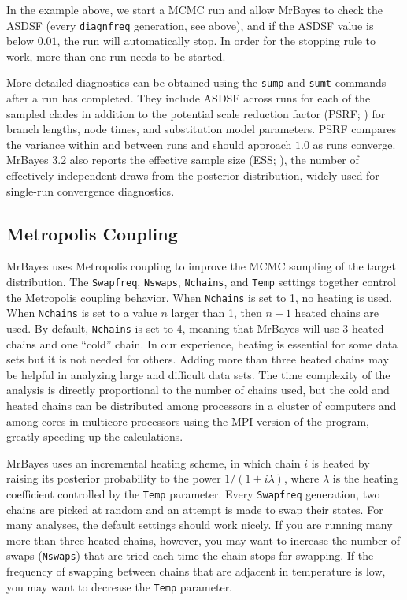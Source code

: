 \documentclass[12pt]{book}
\newcommand{\ttt}[1]{\texttt{#1}}
\begin{document}
In the example above, we start a MCMC run and allow MrBayes to check the ASDSF (every
\ttt{diagnfreq} generation, see above), and if the ASDSF value is below $0.01$, the run will
automatically stop. In order for the stopping rule to work, more than one run needs to be started.

More detailed diagnostics can be obtained using the \ttt{sump} and \ttt{sumt} commands after a run
has completed. They include ASDSF across runs for each of the sampled clades in addition to the
potential scale reduction factor (PSRF; \citep{gelman92}) for branch lengths, node times, and
substitution model parameters. PSRF compares the variance within and between runs and should
approach $1.0$ as runs converge. MrBayes 3.2 also reports the effective sample size (ESS;
\citep{ripley87}), the number of effectively independent draws from the posterior distribution,
widely used for single-run convergence diagnostics.


\subsection{Metropolis Coupling}
\label{metropolisCoupling}

MrBayes uses Metropolis coupling to improve the MCMC sampling of the target distribution. The
\ttt{Swapfreq}, \ttt{Nswaps}, \ttt{Nchains}, and \ttt{Temp} settings together control the
Metropolis coupling behavior. When \ttt{Nchains} is set to 1, no heating is used. When
\ttt{Nchains} is set to a value $n$ larger than 1, then $n - 1$ heated chains are used. By default,
\ttt{Nchains} is set to 4, meaning that MrBayes will use 3 heated chains and one ``cold'' chain. In
our experience, heating is essential for some data sets but it is not needed for others. Adding
more than three heated chains may be helpful in analyzing large and difficult data sets. The time
complexity of the analysis is directly proportional to the number of chains used, but the cold and
heated chains can be distributed among processors in a cluster of computers and among cores in
multicore processors using the MPI version of the program, greatly speeding up the calculations.

MrBayes uses an incremental heating scheme, in which chain $i$ is heated by raising its posterior
probability to the power $1/ (1 + i\lambda)$, where $\lambda$ is the heating coefficient controlled
by the \ttt{Temp} parameter. Every \ttt{Swapfreq} generation, two chains are picked at random
and an attempt is made to swap their states. For many analyses, the default settings should work
nicely. If you are running many more than three heated chains, however, you may want to increase
the number of swaps (\ttt{Nswaps}) that are tried each time the chain stops for swapping. If the
frequency of swapping between chains that are adjacent in temperature is low, you may want to
decrease the \ttt{Temp} parameter.
\end{document}
